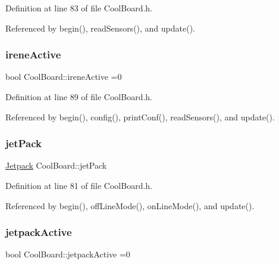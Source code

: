 Definition at line 83 of file Cool\+Board.\+h.



Referenced by begin(), read\+Sensors(), and update().

\mbox{\label{classCoolBoard_a9c3f7ac625481ee2ae802a25d97a4ae0}} 
\subsubsection{\texorpdfstring{irene\+Active}{ireneActive}}
{\footnotesize\ttfamily bool Cool\+Board\+::irene\+Active =0\hspace{0.3cm}{\ttfamily [private]}}



Definition at line 89 of file Cool\+Board.\+h.



Referenced by begin(), config(), print\+Conf(), read\+Sensors(), and update().

\mbox{\label{classCoolBoard_a30b1357881b01ccbec676856a91e48e9}} 
\subsubsection{\texorpdfstring{jet\+Pack}{jetPack}}
{\footnotesize\ttfamily \hyperlink{classJetpack}{Jetpack} Cool\+Board\+::jet\+Pack\hspace{0.3cm}{\ttfamily [private]}}



Definition at line 81 of file Cool\+Board.\+h.



Referenced by begin(), off\+Line\+Mode(), on\+Line\+Mode(), and update().

\mbox{\label{classCoolBoard_a9be03a913d26e558328935ca3b59a75e}} 
\subsubsection{\texorpdfstring{jetpack\+Active}{jetpackActive}}
{\footnotesize\ttfamily bool Cool\+Board\+::jetpack\+Active =0\hspace{0.3cm}{\ttfamily [private]}}



